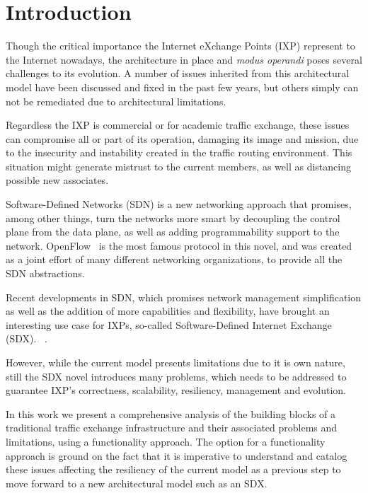 \documentclass[conference]{IEEEtran/IEEEtran}
\begin{document}
%
\IEEEpeerreviewmaketitle


\section{Introduction}
\label{introduction}
Though the critical importance the Internet eXchange Points (IXP) represent to the Internet nowadays, the architecture in place and \textit{modus operandi} poses several challenges to its evolution. A number of issues inherited from this architectural model have been discussed and fixed in the past few years, but others simply can not be remediated due to architectural limitations. 

Regardless the IXP is commercial or for academic traffic exchange, these issues can compromise all or part of its operation, damaging its image and mission, due to the insecurity and instability created in the traffic routing environment. This situation might generate mistrust to the current members, as well as distancing possible new associates.

Software-Defined Networks (SDN) is a new networking approach that promises, among other things, turn the networks more smart by decoupling the control plane from the data plane, as well as adding programmability support to the network. OpenFlow~\cite{mckeown2008openflow} is the most famous protocol in this novel, and was created as a joint effort of many different networking organizations, to provide all the SDN abstractions.

Recent developments in SDN, which promises network management simplification as well as the addition of more capabilities and flexibility, have brought an interesting use case for IXPs, so-called Software-Defined Internet Exchange (SDX). ~\cite{gupta2015sdx}. 

However, while the current model presents limitations due to it is own nature, still the SDX novel introduces many problems, which needs to be addressed to guarantee IXP's correctness, scalability, resiliency, management and evolution.

In this work we present a comprehensive analysis of the building blocks of a traditional traffic exchange infrastructure and their associated problems and limitations, using a functionality approach. The option for a functionality approach is ground on the fact that it is imperative to understand and catalog these issues affecting the resiliency of the current model as a previous step to move forward to a new architectural model such as an SDX. 
\end{document}
